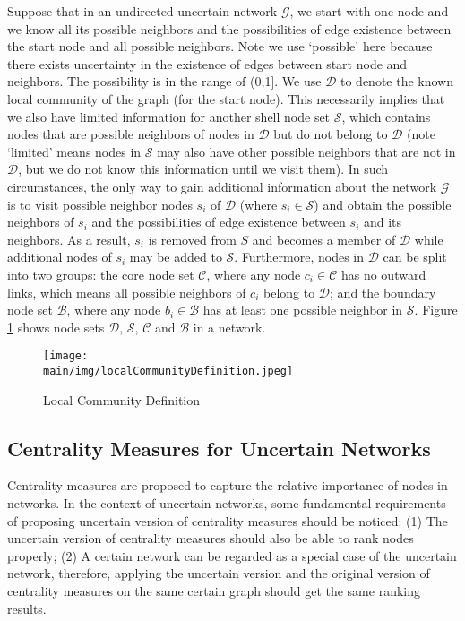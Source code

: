 \documentclass[\main/thesis.tex]{subfiles}
\begin{document}
Suppose that in an undirected uncertain network $\mathcal{G}$, we start with one node and we know all its possible neighbors and the possibilities of edge existence between the start node and all possible neighbors. Note we use `possible' here because there exists uncertainty in the existence of edges between start node and neighbors. The possibility is in the range of (0,1]. We use $\mathcal{D}$ to denote the known local community of the graph (for the start node). This necessarily implies that we also have limited information for another shell node set $\mathcal{S}$, which contains nodes that are possible neighbors of nodes in $\mathcal{D}$ but do not belong to $\mathcal{D}$ (note `limited' means nodes in $\mathcal{S}$ may also have other possible neighbors that are not in $\mathcal{D}$, but we do not know this information until we visit them). In such circumstances, the only way to gain additional information about the network $\mathcal{G}$ is to visit possible neighbor nodes $s_i$ of $\mathcal{D}$ (where $s_i\in \mathcal{S}$) and obtain the possible neighbors of $s_i$ and the possibilities of edge existence between $s_i$ and its neighbors. As a result, $s_i$ is removed from $S$ and becomes a member of $\mathcal{D}$ while additional nodes of $s_i$ may be added to $\mathcal{S}$. Furthermore, nodes in $\mathcal{D}$ can be split into two groups: the core node set $\mathcal{C}$, where any node $c_i\in \mathcal{C}$ has no outward links, which means all possible neighbors of $c_i$ belong to $\mathcal{D}$; and the boundary node set $\mathcal{B}$, where any node $b_i\in \mathcal{B}$ has at least one possible neighbor in $\mathcal{S}$. Figure \ref{Local_Community_Definition} shows node sets $\mathcal{D}$, $\mathcal{S}$, $\mathcal{C}$ and $\mathcal{B}$ in a network.

\begin{figure}
\centering
\texttt{[image: \\main/img/localCommunityDefinition.jpeg]}
\caption{Local Community Definition}
\label{Local_Community_Definition}
\end{figure}

\subsection{Centrality Measures for Uncertain Networks}
Centrality measures are proposed to capture the relative importance of nodes in networks. In the context of uncertain networks, some fundamental requirements of proposing uncertain version of centrality measures should be noticed: (1) The uncertain version of centrality measures should also be able to rank nodes properly; (2) A certain network can be regarded as a special case of the uncertain network, therefore, applying the uncertain version and the original version of centrality measures on the same certain graph should get the same ranking results.
\end{document}
